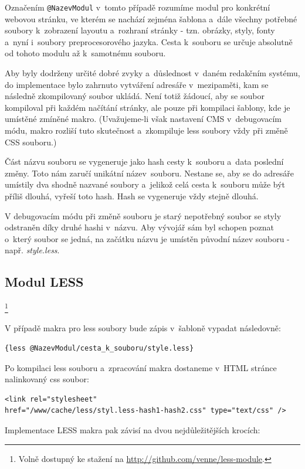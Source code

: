 \documentclass[thesis=B,czech]{FITthesis}[2012/06/26]
\begin{document}
Označením \verb#@NazevModul# v~tomto případě rozumíme modul pro konkrétní webovou stránku, ve kterém se nachází zejména  šablona a~dále všechny potřebné soubory k~zobrazení layoutu a~rozhraní stránky - tzn. obrázky, styly, fonty a~nyní i~soubory preprocesorového jazyka. Cesta k~souboru se určuje absolutně od tohoto modulu až k~samotnému souboru\cite{ven}. 

Aby byly dodrženy určité dobré zvyky a~důslednost v~daném redakčním systému, do implementace bylo zahrnuto vytváření adresáře v~mezipaměti, kam se následně zkompilovaný soubor ukládá. Není totiž žádoucí, aby se soubor kompiloval při každém načítání stránky, ale pouze při kompilaci šablony, kde je umístěné zmíněné makro. (Uvažujeme-li však nastavení \gls{CMS} v~debugovacím módu, makro rozliší tuto skutečnost a~zkompiluje less soubory vždy při změně \gls{CSS} souboru.)  

Část názvu souboru se vygeneruje jako hash cesty k~souboru a~data poslední změny. Toto nám zaručí unikátní název~souboru. Nestane se, aby se do adresáře umístily dva shodně nazvané soubory a~jelikož celá cesta k~souboru může být příliš dlouhá, vyřeší toto hash. Hash se vygeneruje vždy stejně dlouhá.

V debugovacím módu při změně souboru je starý nepotřebný soubor se styly odstraněn díky druhé hashi v~názvu. Aby vývojář sám byl schopen poznat o~který soubor se jedná, na začátku názvu je umístěn původní název souboru - např. \textit{style.less}.



\subsection{Modul LESS}\footnote{Volně dostupný ke stažení na \url{http://github.com/venne/less-module}.}

V případě makra pro less soubory bude zápis v~šabloně vypadat následovně:
\scriptsize
\begin{verbatim}
{less @NazevModul/cesta_k_souboru/style.less}
\end{verbatim}
\normalsize
Po kompilaci less souboru a~zpracování makra dostaneme v~\gls{HTML} stránce nalinkovaný css soubor:
\scriptsize
\begin{verbatim}
<link rel="stylesheet"
href="/www/cache/less/styl.less-hash1-hash2.css" type="text/css" />
\end{verbatim}
\normalsize
Implementace LESS makra pak závisí na dvou nejdůležitějších krocích:
\end{document}
